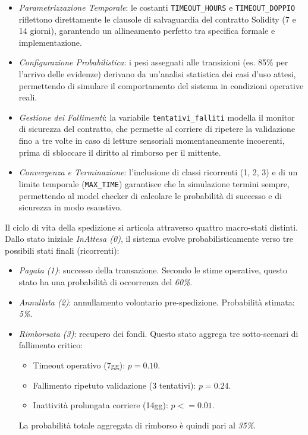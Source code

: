 \begin{itemize}
    \item \textit{Parametrizzazione Temporale}: le costanti \texttt{TIMEOUT\_HOURS} e \texttt{TIMEOUT\_DOPPIO} riflettono direttamente le clausole di salvaguardia del contratto Solidity (7 e 14 giorni), garantendo un allineamento perfetto tra specifica formale e implementazione.
    \item \textit{Configurazione Probabilistica}: i pesi assegnati alle transizioni (es. 85\% per l'arrivo delle evidenze) derivano da un'analisi statistica dei casi d'uso attesi, permettendo di simulare il comportamento del sistema in condizioni operative reali.
    \item \textit{Gestione dei Fallimenti}: la variabile \texttt{tentativi\_falliti} modella il monitor di sicurezza del contratto, che permette al corriere di ripetere la validazione fino a tre volte in caso di letture sensoriali momentaneamente incoerenti, prima di sbloccare il diritto al rimborso per il mittente.
    \item \textit{Convergenza e Terminazione}: l'inclusione di classi ricorrenti (1, 2, 3) e di un limite temporale (\texttt{MAX\_TIME}) garantisce che la simulazione termini sempre, permettendo al model checker di calcolare le probabilità di successo e di sicurezza in modo esaustivo.
\end{itemize}

Il ciclo di vita della spedizione si articola attraverso quattro macro-stati distinti. Dallo stato iniziale \textit{InAttesa (0)}, il sistema evolve probabilisticamente verso tre possibili stati finali (ricorrenti):
\begin{itemize}
    \item \textit{Pagata (1)}: successo della transazione. Secondo le stime operative, questo stato ha una probabilità di occorrenza del \textit{60\%}.
    \item \textit{Annullata (2)}: annullamento volontario pre-spedizione. Probabilità stimata: \textit{5\%}.
    \item \textit{Rimborsata (3)}: recupero dei fondi. Questo stato aggrega tre sotto-scenari di fallimento critico:
    \begin{itemize}
        \item Timeout operativo (7gg): $p=0.10$.
        \item Fallimento ripetuto validazione (3 tentativi): $p=0.24$.
        \item Inattività prolungata corriere (14gg): $p <= 0.01$.
    \end{itemize}
    La probabilità totale aggregata di rimborso è quindi pari al \textit{35\%}.
\end{itemize}

